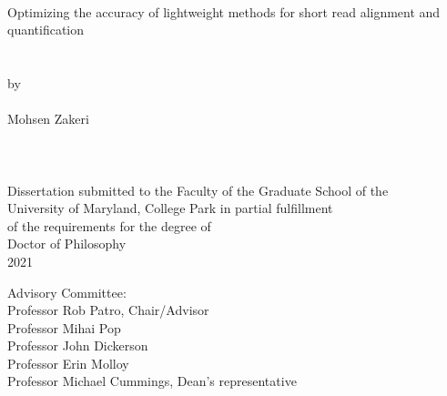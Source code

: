 
\thispagestyle{empty}
\hbox{\ }
\vspace{1in}
\renewcommand{\baselinestretch}{1}
\small\normalsize
\begin{center}

\large{{Optimizing the accuracy of lightweight methods 
for short read alignment and quantification}}\\
\ \\
\ \\
\large{by} \\
\ \\
\large{Mohsen Zakeri}%
\ \\
\ \\
\ \\
\ \\
\normalsize
Dissertation submitted to the Faculty of the Graduate School of the \\
University of Maryland, College Park in partial fulfillment \\
of the requirements for the degree of \\
Doctor of Philosophy \\
2021
\end{center}

\vspace{7.5em}

\noindent Advisory Committee: \\
Professor Rob Patro, Chair/Advisor \\
Professor Mihai Pop \\
Professor John Dickerson \\
Professor Erin Molloy \\
Professor Michael Cummings, Dean's representative
